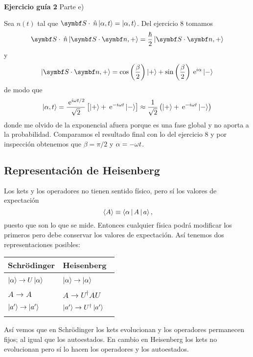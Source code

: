 \documentclass[10pt,oneside]{CBFT_book}
\begin{document}
\begin{ejemplo}{\bf Ejercicio guía 2}
Parte e)

Sea $n(t)$ tal que $\vb S \cdot \nver \Ket{\a,t} = \Ket{\a,t}$. Del ejercicio 8 tomamos
\[
	\vb S \cdot \nver \Ket{ \vb S\cdot\vb n, +} = \frac{\hbar}{2}\Ket{ \vb S\cdot\vb n, +}
\]
y
\[
	\Ket{ \vb S\cdot\vb n, +} = \cos\Frac{\b}{2} \Ket{+} + \sin\Frac{\b}{2} \euler^{i\a} \Ket{-}
\]
de modo que
\[
	\Ket{\alpha,t} = \frac{\:\mathrm{e}^{i\omega t/2}}{\sqrt{2}} \left[ \Ket{+} + \:\mathrm{e}^{-i\omega t} \Ket{-} \right]
	\approx \frac{1}{\sqrt{2}} \left( \Ket{+} + \:\mathrm{e}^{-i\omega t} \Ket{-} \right)
\]
donde me olvido de la exponencial afuera porque es una fase global y no aporta a la probabilidad.
Comparamos el resultado final con lo del ejercicio 8 y por inspección obtenemos que
$\beta = \pi/2$ y $\alpha = -\omega t$.
 
\end{ejemplo}


\subsection{Representación de Heisenberg}

Los kets y los operadores no tienen sentido físico, pero sí los valores de expectación
\[
	\:\left\langle A \right\rangle \equiv \Braket{\alpha|A|a},
\]
puesto que son lo que se mide. Entonces cualquier física podrá modificar los primeros
pero debe conservar los valores de expectación. 
Así tenemos dos representaciones posibles:

\begin{center}
\begin{tabular}{|l|l|}
\hline
Schrödinger & Heisenberg \\
\hline
& \\
$\Ket{\alpha} \to U\Ket{\alpha} \quad $ & $\Ket{\alpha} \to \Ket{\alpha} \quad $ \\
& \\
$A \to A \quad $ & $A \to U^\dagger AU \quad$ \\
& \\
$\Ket{a'} \to \Ket{a'} \quad $ & $\Ket{a'} \to U^\dagger \Ket{a'} \quad $ \\
& \\
\hline
\end{tabular}
\end{center}
Así vemos que en Schrödinger los kets evolucionan y los operadores permanecen fijos; al igual que los autoestados.
En cambio en Heisenberg los kets no evolucionan pero sí lo hacen los operadores y los autoestados.
\end{document}
